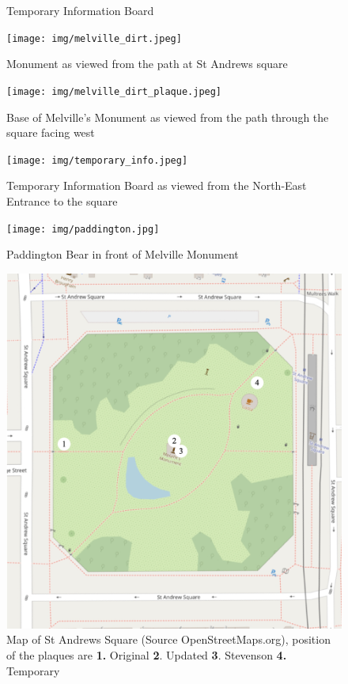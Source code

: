 \documentclass{scrartcl}
\begin{document}
\begin{appendices}
\begin{figure}
    \caption{Temporary Information Board}
    \label{fig:temp_info}
\end{figure}
\begin{figure}
    \centering
    \texttt{[image: img/melville\_dirt.jpeg]}
    \caption{Monument as viewed from the path at St Andrews square}
    \label{fig:melville-dirt}
\end{figure}

\begin{figure}
    \centering
    \texttt{[image: img/melville\_dirt\_plaque.jpeg]}
    \caption{Base of Melville's Monument as viewed from the path through the square facing  west}
    \label{fig:melville-dirt-plaque}
\end{figure}

\begin{figure}
    \centering
    \texttt{[image: img/temporary\_info.jpeg]}
    \caption{Temporary Information Board as viewed from the North-East Entrance to the square}
    \label{fig:temp-info-square}
\end{figure}

\begin{figure}
    \centering
    \texttt{[image: img/paddington.jpg]}
    \caption{Paddington Bear in front of Melville Monument}
    \label{fig:paddington}
\end{figure}

\begin{figure}
    \centering
    \includegraphics[width=1\linewidth]{img/map_numbered.png}
    \caption{Map of St Andrews Square (Source OpenStreetMaps.org), position of the plaques are \textbf{1.} Original \textbf{2}. Updated \textbf{3}. Stevenson \textbf{4.} Temporary}
    \label{fig:st_andrews_map}
\end{figure}


\end{appendices}
\end{document}
